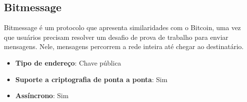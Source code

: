 \subsection{Bitmessage}

Bitmessage é um protocolo que apresenta similaridades com o Bitcoin, uma vez que usuários precisam resolver um desafio de prova de trabalho para enviar mensagens. Nele, mensagens percorrem a rede inteira até chegar ao destinatário. \cite{bitmessage}

\begin{itemize}
  \item \textbf{Tipo de endereço}: Chave pública
  \item \textbf{Suporte a criptografia de ponta a ponta}: Sim
  \item \textbf{Assíncrono}: Sim
\end{itemize}

